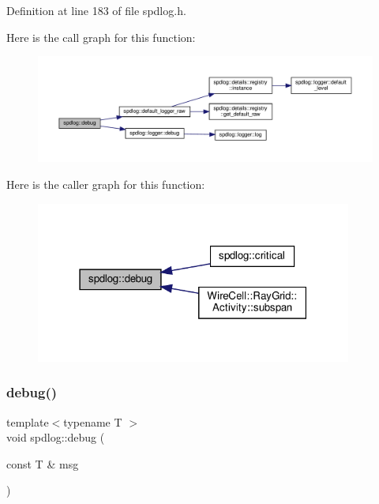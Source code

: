 Definition at line 183 of file spdlog.\+h.

Here is the call graph for this function\+:
\nopagebreak
\begin{figure}[H]
\begin{center}
\leavevmode
\includegraphics[width=350pt]{namespacespdlog_a29e62b80052a1440e526853d4b2c3c5c_cgraph}
\end{center}
\end{figure}
Here is the caller graph for this function\+:
\nopagebreak
\begin{figure}[H]
\begin{center}
\leavevmode
\includegraphics[width=295pt]{namespacespdlog_a29e62b80052a1440e526853d4b2c3c5c_icgraph}
\end{center}
\end{figure}
\mbox{\label{namespacespdlog_a93c284cebdb3b3dab204f2a87344e4b5}} 
\subsubsection{\texorpdfstring{debug()}{debug()}\hspace{0.1cm}{\footnotesize\ttfamily [2/2]}}
{\footnotesize\ttfamily template$<$typename T $>$ \\
void spdlog\+::debug (\begin{DoxyParamCaption}\item[{const T \&}]{msg }\end{DoxyParamCaption})\hspace{0.3cm}{\ttfamily [inline]}}



